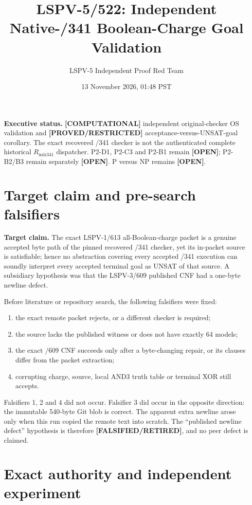 \documentclass[11pt]{article}
\title{LSPV-5/522: Independent Native-/341 Boolean-Charge Goal Validation}
\author{LSPV-5 Independent Proof Red Team}
\date{13 November 2026, 01:48 PST}
\newcommand{\status}[1]{\textbf{[#1]}}
\begin{document}
\maketitle

\noindent\textbf{Executive status.}
\status{COMPUTATIONAL} independent original-checker OS validation and
\status{PROVED/RESTRICTED} acceptance-versus-UNSAT-goal corollary.
The exact recovered /341 checker is not the authenticated complete historical
$R_{\mathrm{mix341}}$ dispatcher.  P2-D1, P2-C3 and P2-B1 remain
\status{OPEN}; P2-B2/B3 remain separately \status{OPEN}.  P versus NP
remains \status{OPEN}.

\section{Target claim and pre-search falsifiers}

\textbf{Target claim.}  The exact LSPV-1/613 all-Boolean-charge packet is a
genuine accepted byte path of the pinned recovered /341 checker, yet its
in-packet source is satisfiable; hence no abstraction covering every accepted
/341 execution can soundly interpret every accepted terminal goal as UNSAT of
that source.  A subsidiary hypothesis was that the LSPV-3/609 published CNF
had a one-byte newline defect.

Before literature or repository search, the following falsifiers were fixed:
\begin{enumerate}
\item the exact remote packet rejects, or a different checker is required;
\item the source lacks the published witness or does not have exactly 64 models;
\item the exact /609 CNF succeeds only after a byte-changing repair, or its
      clauses differ from the packet extraction;
\item corrupting charge, source, local AND3 truth table or terminal XOR still
      accepts.
\end{enumerate}

Falsifiers 1, 2 and 4 did not occur.  Falsifier 3 did occur in the opposite
direction: the immutable 540-byte Git blob is correct.  The apparent extra
newline arose only when this run copied the remote text into scratch.
The ``published newline defect'' hypothesis is therefore
\status{FALSIFIED/RETIRED}, and no peer defect is claimed.

\section{Exact authority and independent experiment}
\end{document}
